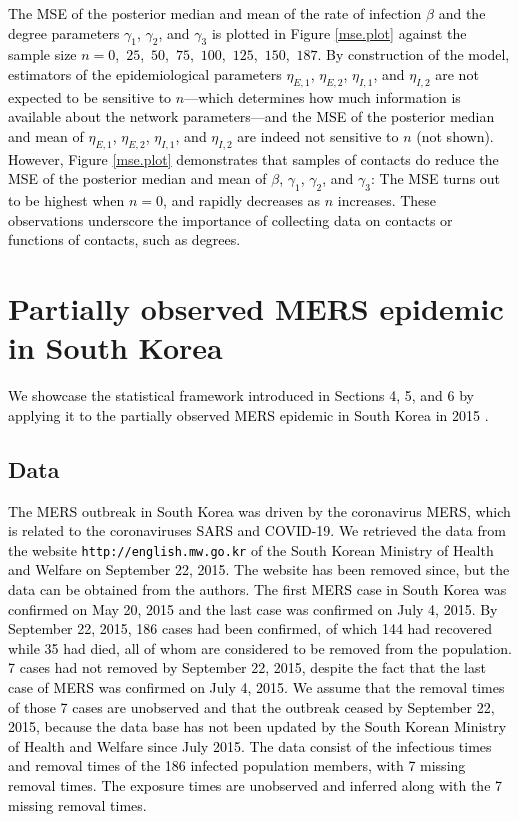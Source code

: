 \documentclass[12pt,usenatbib,referee]{article}
\renewcommand{\alert}{\textcolor{black}}
\begin{document}
\alert{The MSE of the posterior median and mean of the rate of infection $\beta$ and the degree parameters $\gamma_1$, $\gamma_2$, and $\gamma_3$ is plotted in Figure \ref{mse.plot} against the sample size $n = 0$,\, $25$,\, $50$,\, $75$,\, $100$,\, $125$,\, $150$,\, $187$.
By construction of the model,
estimators of the epidemiological parameters $\eta_{E,1}$, $\eta_{E,2}$, $\eta_{I,1}$, and $\eta_{I,2}$ are not expected to be sensitive to $n$---which determines how much information is available about the network parameters---and the MSE of the posterior median and mean of $\eta_{E,1}$, $\eta_{E,2}$, $\eta_{I,1}$, and $\eta_{I,2}$ are indeed not sensitive to $n$ (not shown).
However,
Figure \ref{mse.plot} demonstrates that samples of contacts do reduce the MSE of the posterior median and mean of $\beta$, $\gamma_1$, $\gamma_2$, and $\gamma_3$:
The MSE turns out to be highest when $n = 0$,
and rapidly decreases as $n$ increases.
These observations underscore the importance of collecting data on contacts or functions of contacts, 
such as degrees.}

\section{Partially observed MERS epidemic in South Korea}
\label{application}

\alert{We showcase the statistical framework introduced in Sections 4, 5, and 6 by applying it to the partially observed MERS epidemic in South Korea in 2015 \citep{Ki15}.}

\subsection{Data}
\label{sec:data}

\alert{The MERS outbreak in South Korea was driven by the coronavirus MERS,
which is related to the coronaviruses SARS and COVID-19.
We retrieved the data from the website {\tt http://english.mw.go.kr} of the South Korean Ministry of Health and Welfare on September 22, 2015.
The website has been removed since,
but the data can be obtained from the authors.
The first MERS case in South Korea was confirmed on May 20, 2015 and the last case was confirmed on July 4, 2015.
By September 22, 2015,
186 cases had been confirmed,
of which 144 had recovered while 35 had died,
all of whom are considered to be removed from the population.
7 cases had not removed by September 22, 2015, 
despite the fact that the last case of MERS was confirmed on July 4, 2015.
We assume that the removal times of those 7 cases are unobserved and that the outbreak ceased by September 22, 2015,
because the data base has not been updated by the South Korean Ministry of Health and Welfare since July 2015.
The data consist of the infectious times and removal times of the 186 infected population members, 
with 7 missing removal times.
The exposure times are unobserved and inferred along with the 7 missing removal times.
}
\end{document}
